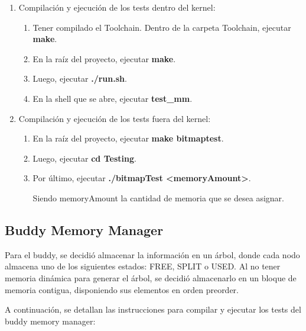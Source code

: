 \documentclass{article}
\begin{document}
\begin{enumerate}

\item Compilación y ejecución de los tests dentro del kernel:

\begin{enumerate}
    \item Tener compilado el Toolchain. Dentro de la carpeta Toolchain, ejecutar \textbf{make}.
    \item En la raíz del proyecto, ejecutar \textbf{make}.
    \item Luego, ejecutar \textbf{./run.sh}.
    \item En la shell que se abre, ejecutar \textbf{test\_mm}.
\end{enumerate}

\item Compilación y ejecución de los tests fuera del kernel:

\begin{enumerate}
    \item En la raíz del proyecto, ejecutar \textbf{make bitmaptest}.
    \item Luego, ejecutar \textbf{cd Testing}.
    \item Por último, ejecutar \textbf{./bitmapTest \textless memoryAmount\textgreater}. 

    Siendo memoryAmount la cantidad de memoria que se desea asignar.
\end{enumerate}

\end{enumerate}

\subsection {Buddy Memory Manager}

Para el buddy, se decidió almacenar la información en un árbol, donde cada nodo almacena uno de los siguientes estados: FREE, SPLIT o USED. Al no tener memoria dinámica para generar el árbol, se decidió almacenarlo en un bloque de memoria contigua, disponiendo sus elementos en orden preorder.

A continuación, se detallan las instrucciones para compilar y ejecutar los tests del buddy memory manager:
\end{document}
